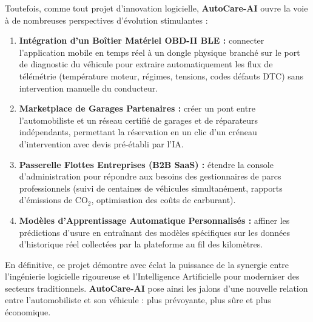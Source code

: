 \documentclass[12pt,a4paper,twoside,openright]{report}
\begin{document}
  Toutefois, comme tout projet d'innovation logicielle, \textbf{AutoCare-AI} ouvre la voie \`a de nombreuses perspectives d'\'evolution stimulantes :
  \begin{enumerate}
    \item \textbf{Int\'egration d'un Bo\^itier Mat\'eriel OBD-II BLE :} connecter l'application mobile en temps r\'eel \`a un dongle physique branch\'e sur le port de diagnostic du v\'ehicule pour extraire automatiquement les flux de t\'el\'em\'etrie (temp\'erature moteur, r\'egimes, tensions, codes d\'efauts DTC) sans intervention manuelle du conducteur.
    \item \textbf{Marketplace de Garages Partenaires :} cr\'eer un pont entre l'automobiliste et un r\'eseau certifi\'e de garages et de r\'eparateurs ind\'ependants, permettant la r\'eservation en un clic d'un cr\'eneau d'intervention avec devis pr\'e-\'etabli par l'IA.
    \item \textbf{Passerelle Flottes Entreprises (B2B SaaS) :} \'etendre la console d'administration pour r\'epondre aux besoins des gestionnaires de parcs professionnels (suivi de centaines de v\'ehicules simultan\'ement, rapports d'\'emissions de CO$_2$, optimisation des co\^uts de carburant).
    \item \textbf{Mod\`eles d'Apprentissage Automatique Personnalis\'es :} affiner les pr\'edictions d'usure en entra\^inant des mod\`eles sp\'ecifiques sur les donn\'ees d'historique r\'eel collect\'ees par la plateforme au fil des kilom\`etres.
  \end{enumerate}

  En d\'efinitive, ce projet d\'emontre avec \'eclat la puissance de la synergie entre l'ing\'enierie logicielle rigoureuse et l'Intelligence Artificielle pour moderniser des secteurs traditionnels. \textbf{AutoCare-AI} pose ainsi les jalons d'une nouvelle relation entre l'automobiliste et son v\'ehicule : plus pr\'evoyante, plus s\^ure et plus \'economique.

  \newpage
\end{document}
